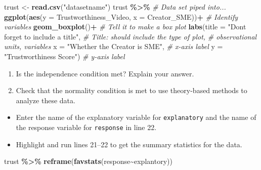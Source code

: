 \documentclass[
]{report}
\newenvironment{Shaded}{\begin{snugshade}}{\end{snugshade}}
\newcommand{\AttributeTok}[1]{\textcolor[rgb]{0.13,0.29,0.53}{#1}}
\newcommand{\CommentTok}[1]{\textcolor[rgb]{0.56,0.35,0.01}{\textit{#1}}}
\newcommand{\FunctionTok}[1]{\textcolor[rgb]{0.13,0.29,0.53}{\textbf{#1}}}
\newcommand{\NormalTok}[1]{#1}
\newcommand{\OtherTok}[1]{\textcolor[rgb]{0.56,0.35,0.01}{#1}}
\newcommand{\SpecialCharTok}[1]{\textcolor[rgb]{0.81,0.36,0.00}{\textbf{#1}}}
\newcommand{\StringTok}[1]{\textcolor[rgb]{0.31,0.60,0.02}{#1}}
\begin{document}
\begin{Shaded}
\begin{Highlighting}[]
\NormalTok{trust }\OtherTok{\textless{}{-}} \FunctionTok{read.csv}\NormalTok{(}\StringTok{"datasetname"}\NormalTok{)}
\NormalTok{trust }\SpecialCharTok{\%\textgreater{}\%}  \CommentTok{\# Data set piped into...}
  \FunctionTok{ggplot}\NormalTok{(}\FunctionTok{aes}\NormalTok{(}\AttributeTok{y =}\NormalTok{ Trustworthiness\_Video, }\AttributeTok{x =}\NormalTok{ Creator\_SME))}\SpecialCharTok{+}  \CommentTok{\# Identify variables}
  \FunctionTok{geom\_boxplot}\NormalTok{()}\SpecialCharTok{+}  \CommentTok{\# Tell it to make a box plot}
  \FunctionTok{labs}\NormalTok{(}\AttributeTok{title =} \StringTok{"Don\textquotesingle{}t forget to include a title"}\NormalTok{,  }\CommentTok{\# Title: should include the type of plot,}
       \CommentTok{\# observational units, variables}
       \AttributeTok{x =} \StringTok{"Whether the Creator is SME"}\NormalTok{,    }\CommentTok{\# x{-}axis label}
       \AttributeTok{y =} \StringTok{"Trustworthiness Score"}\NormalTok{)  }\CommentTok{\# y{-}axis label}
\end{Highlighting}
\end{Shaded}

\begin{enumerate}
\def\labelenumi{\arabic{enumi}.}
\setcounter{enumi}{3}
\item
  Is the independence condition met? Explain your answer.
  \vspace{0.8in}
\item
  Check that the normality condition is met to use theory-based methods to analyze these data.
\end{enumerate}

\vspace{0.8in}

\begin{itemize}
\item
  Enter the name of the explanatory variable for \texttt{explanatory} and the name of the response variable for \texttt{response} in line 22.
\item
  Highlight and run lines 21--22 to get the summary statistics for the data.
\end{itemize}

\begin{Shaded}
\begin{Highlighting}[]
\NormalTok{trust }\SpecialCharTok{\%\textgreater{}\%}
  \FunctionTok{reframe}\NormalTok{(}\FunctionTok{favstats}\NormalTok{(response}\SpecialCharTok{\textasciitilde{}}\NormalTok{explantory))}
\end{Highlighting}
\end{Shaded}
\end{document}
